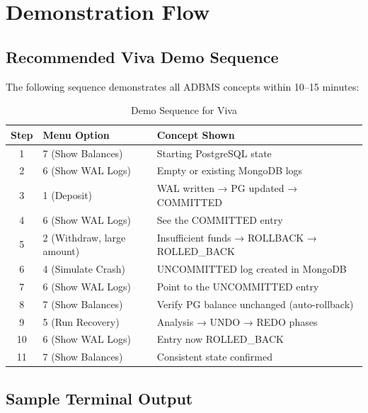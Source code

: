 
\chapter{Demonstration Flow}

\section{Recommended Viva Demo Sequence}

The following sequence demonstrates all ADBMS concepts within 10--15 minutes:

\begin{table}[H]
\centering
\caption{Demo Sequence for Viva}
\begin{tabularx}{\textwidth}{clX}
\toprule
\textbf{Step} & \textbf{Menu Option} & \textbf{Concept Shown} \\
\midrule
1 & 7 (Show Balances) & Starting PostgreSQL state \\
2 & 6 (Show WAL Logs) & Empty or existing MongoDB logs \\
3 & 1 (Deposit) & WAL written → PG updated → COMMITTED \\
4 & 6 (Show WAL Logs) & See the COMMITTED entry \\
5 & 2 (Withdraw, large amount) & Insufficient funds → ROLLBACK → ROLLED\_BACK \\
6 & 4 (Simulate Crash) & UNCOMMITTED log created in MongoDB \\
7 & 6 (Show WAL Logs) & Point to the UNCOMMITTED entry \\
8 & 7 (Show Balances) & Verify PG balance unchanged (auto-rollback) \\
9 & 5 (Run Recovery) & Analysis → UNDO → REDO phases \\
10 & 6 (Show WAL Logs) & Entry now ROLLED\_BACK \\
11 & 7 (Show Balances) & Consistent state confirmed \\
\bottomrule
\end{tabularx}
\end{table}

\section{Sample Terminal Output}


